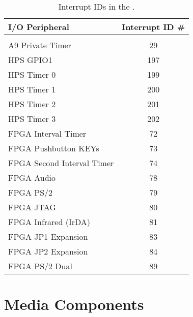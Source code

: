 \begin{table}[h]
    \begin{center}
    \begin{tabular}{l|c}
          \textbf{I/O Peripheral} &
          \textbf{Interrupt ID \#}        \\
          \hline\vspace{-3mm}             \\
          A9 Private Timer & 29           \\
          HPS GPIO1 & 197                 \\
          HPS Timer 0 & 199               \\
          HPS Timer 1 & 200               \\
          HPS Timer 2 & 201               \\
          HPS Timer 3 & 202               \\
		  FPGA Interval Timer & 72        \\
		  FPGA Pushbutton KEYs & 73       \\
		  FPGA Second Interval Timer & 74 \\
		  FPGA Audio & 78                 \\
		  FPGA PS/2 & 79                  \\
		  FPGA JTAG & 80                  \\
		  FPGA Infrared (IrDA) & 81       \\
		  FPGA JP1 Expansion & 83         \\
		  FPGA JP2 Expansion & 84         \\
		  FPGA PS/2 Dual & 89             \\
    \end{tabular}
    \caption{Interrupt IDs in the \systemNameFull.}
	\label{tab:irq}
    \end{center}
\end{table}












\newpage
\section{Media Components}
\label{sec:multi}

